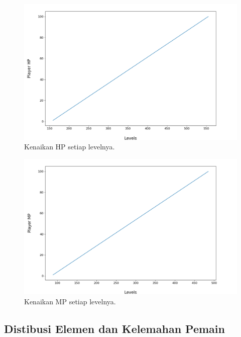 \begin{figure} [!h] \centering
	\includegraphics[scale=0.45]{img/PlayerHpDistrib.png}
	\caption{Kenaikan HP setiap levelnya.}
	\vspace{-2ex}
	\label{fig:hp_player}
\end{figure}

\begin{figure} [!h] \centering
	\includegraphics[scale=0.45]{img/PlayerMpDistrib.png}
	\caption{Kenaikan MP setiap levelnya.}
	\vspace{-2ex}
	\label{fig:mp_player}
\end{figure}

\subsection{Distibusi Elemen dan Kelemahan Pemain}
\label{sec:sub_sec4_eval_dist_element_single-character}
\vspace{1ex}

